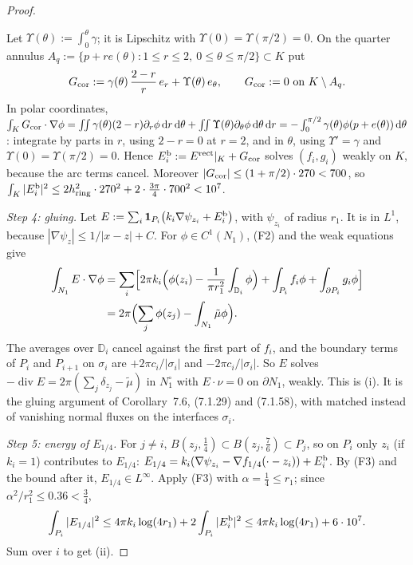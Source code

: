\documentclass[11pt]{article}
\theoremstyle{definition}
\theoremstyle{remark}
\newcommand{\dd}{\,\mathrm d}
\begin{document}
\begin{proof}
\begin{itemize}[leftmargin=*]
  Let $\Upsilon(\theta):=\int_0^\theta\gamma$; it is Lipschitz with $\Upsilon(0)=\Upsilon(\pi/2)=0$. On the
  quarter annulus $A_q:=\{p+re(\theta):1\le r\le2,\ 0\le\theta\le\pi/2\}\subset K$ put
  \[
  G_{\rm cor}:=\gamma(\theta)\,\frac{2-r}r\,e_r+\Upsilon(\theta)\,e_\theta,\qquad G_{\rm cor}:=0\ \text{on }K\setminus A_q .
  \]
  In polar coordinates,
  $\int_KG_{\rm cor}\cdot\nabla\phi=\int\!\!\int\gamma(\theta)(2-r)\partial_r\phi\dd r\dd\theta+\int\!\!\int\Upsilon(\theta)\partial_\theta\phi\dd\theta\dd r
  =-\int_0^{\pi/2}\gamma(\theta)\phi(p+e(\theta))\dd\theta$: integrate by parts in $r$, using $2-r=0$ at
  $r=2$, and in $\theta$, using $\Upsilon'=\gamma$ and $\Upsilon(0)=\Upsilon(\pi/2)=0$. Hence
  $E_i^{\rm b}:=E^{\rm rect}|_K+G_{\rm cor}$ solves $(f_i,g_i)$ weakly on $K$, because the arc terms cancel. Moreover
  $|G_{\rm cor}|\le(1+\pi/2)\cdot270<700$, so
  $\int_K|E_i^{\rm b}|^2\le2h_{\rm ring}^2\cdot270^2+2\cdot\tfrac{3\pi}4\cdot700^2<10^7$.
\end{itemize}

\emph{Step 4: gluing.} Let $E:=\sum_i\mathbf 1_{P_i}\bigl(k_i\nabla\psi_{z_i}+E_i^{\rm b}\bigr)$, with
$\psi_{z_i}$ of radius $r_1$. It is in $L^1$, because $|\nabla\psi_z|\le1/|x-z|+C$. For $\phi\in C^1(N_1)$,
(F2) and the weak equations give
\begin{align*}
\int_{N_1}E\cdot\nabla\phi
&=\sum_i\Bigl[2\pi k_i\Bigl(\phi(z_i)-\frac{1}{\pi r_1^2}\int_{\mathbb D_i}\phi\Bigr)+\int_{P_i}f_i\phi+\int_{\partial P_i}g_i\phi\Bigr]\\
&=2\pi\Bigl(\sum_j\phi(z_j)-\int_{N_1}\tilde\mu\phi\Bigr).
\end{align*}
The averages over $\mathbb D_i$ cancel against the first part of $f_i$, and the boundary terms of $P_i$ and
$P_{i+1}$ on $\sigma_i$ are $+2\pi c_i/|\sigma_i|$ and $-2\pi c_i/|\sigma_i|$. So $E$ solves
$-\operatorname{div}E=2\pi(\sum_j\delta_{z_j}-\tilde\mu)$ in $N_1^\circ$ with $E\cdot\nu=0$ on $\partial N_1$,
weakly. This is (i). It is the gluing
argument of Corollary~7.6, (7.1.29) and (7.1.58), with
matched instead of vanishing normal fluxes on the interfaces $\sigma_i$.

\emph{Step 5: energy of $E_{1/4}$.} For $j\ne i$, $B(z_j,\tfrac14)\subset B(z_j,\tfrac76)\subset P_j$, so
on $P_i$ only $z_i$ (if $k_i=1$) contributes to $E_{1/4}$:
$E_{1/4}=k_i(\nabla\psi_{z_i}-\nabla f_{1/4}(\cdot-z_i))+E_i^{\rm b}$. By (F3) and the bound after it,
$E_{1/4}\in L^\infty$. Apply (F3) with $\alpha=\tfrac14\le r_1$; since $\alpha^2/r_1^2\le0.36<\tfrac34$,
\[
\int_{P_i}|E_{1/4}|^2\le4\pi k_i\log(4r_1)+2\int_{P_i}|E_i^{\rm b}|^2\le4\pi k_i\log(4r_1)+6\cdot10^7 .
\]
Sum over $i$ to get (ii).
\end{proof}
\end{document}
